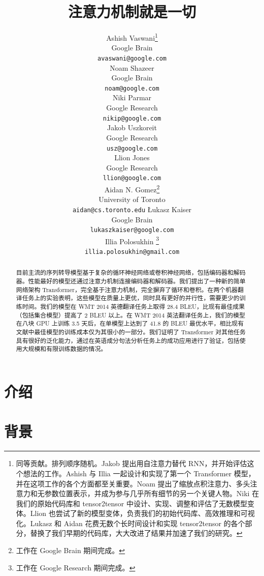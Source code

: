 \documentclass{article}
\title{注意力机制就是一切}
\author{
  \AND
  Ashish Vaswani\thanks{同等贡献。排列顺序随机。Jakob 提出用自注意力替代 RNN，并开始评估这个想法的工作。Ashish 与 Illia 一起设计和实现了第一个 Transformer 模型，并在这项工作的各个方面都至关重要。Noam 提出了缩放点积注意力、多头注意力和无参数位置表示，并成为参与几乎所有细节的另一个关键人物。Niki 在我们的原始代码库和 tensor2tensor 中设计、实现、调整和评估了无数模型变体。Llion 也尝试了新的模型变体，负责我们的初始代码库、高效推理和可视化。Lukasz 和 Aidan 花费无数个长时间设计和实现 tensor2tensor 的各个部分，替换了我们早期的代码库，大大改进了结果并加速了我们的研究。
}\\
  Google Brain\\
  \texttt{avaswani@google.com}\\
  \And
  Noam Shazeer\footnotemark[1]\\
  Google Brain\\
  \texttt{noam@google.com}\\
  \And
  Niki Parmar\footnotemark[1]\\
  Google Research\\
  \texttt{nikip@google.com}\\  
  \And
  Jakob Uszkoreit\footnotemark[1]\\
  Google Research\\
  \texttt{usz@google.com}\\
  \And  
  Llion Jones\footnotemark[1]\\
  Google Research\\
  \texttt{llion@google.com}\\   
  \And
  Aidan N. Gomez\footnotemark[1] \hspace{1.7mm}\thanks{工作在 Google Brain 期间完成。}\\
  University of Toronto\\
  \texttt{aidan@cs.toronto.edu}
  \And
  {\L}ukasz Kaiser\footnotemark[1]\\
  Google Brain\\
  \texttt{lukaszkaiser@google.com}\\
  \And
  Illia Polosukhin\footnotemark[1]\hspace{1.7mm} \thanks{工作在 Google Research 期间完成。}\\
  \texttt{illia.polosukhin@gmail.com}\\  
}
\begin{document}
\maketitle

\begin{abstract}
目前主流的序列转导模型基于复杂的循环神经网络或卷积神经网络，包括编码器和解码器。性能最好的模型还通过注意力机制连接编码器和解码器。我们提出了一种新的简单网络架构 Transformer，完全基于注意力机制，完全摒弃了循环和卷积。在两个机器翻译任务上的实验表明，这些模型在质量上更优，同时具有更好的并行性，需要更少的训练时间。我们的模型在 WMT 2014 英德翻译任务上取得 28.4 BLEU，比现有最佳成果（包括集合模型）提高了 2 BLEU 以上。在 WMT 2014 英法翻译任务上，我们的模型在八块 GPU 上训练 3.5 天后，在单模型上达到了 41.8 的 BLEU 最优水平，相比现有文献中最佳模型的训练成本仅为其很小的一部分。我们证明了 Transformer 对其他任务具有很好的泛化能力，通过在英语成分句法分析任务上的成功应用进行了验证，包括使用大规模和有限训练数据的情况。



\end{abstract}

\section{介绍}



\section{背景}
\end{document}
